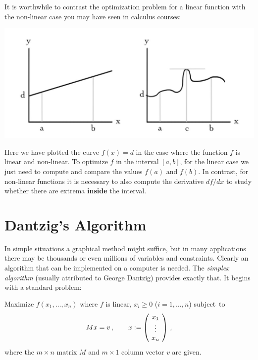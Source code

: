 It is worthwhile to contrast the optimization problem for a linear function with the non-linear case you may have seen in calculus courses:
\vspace{-1.5mm}
\begin{center}
\hspace{-1cm}\includegraphics[alt={Two graphs.  The first is a line for a≤x≤b and y=d.  The second is a wiggly curve with the same domain and range, but the maximum d occurs strictly between a and b.},scale=.33]{simplex/linvsnonlin.jpg}
\end{center}
Here we have plotted the curve $f(x)=d$ in the case where the function $f$ is linear and non-linear. 
To optimize $f$ in the interval $[a,b]$, for the linear case we just need to compute and compare the values $f(a)$ 
and $f(b)$. In contrast, for non-linear functions it is necessary to also compute the derivative $df/dx$ to study whether
there are extrema {\bfseries inside} the interval.

\section{Dantzig's Algorithm}\label{dantzig}

In simple situations a graphical method might suffice, but in many applications there may be thousands or even millions of variables 
and constraints. Clearly an algorithm that can be implemented on a computer is needed. The {\itshape simplex algorithm} (usually attributed to George Dantzig) provides exactly that. It begins with a standard problem:

\begin{problem}
Maximize $f(x_1,\ldots,x_n)$ where $f$ is linear, $x_i\geq 0$ ($i=1,\ldots, n$) subject~to  
\[
Mx = v\, ,\qquad x:=\left(\!\begin{array}{c} x_1\\\vdots \\ x_n \end{array}\!\right)\, ,
\]
where the $m\times n$ matrix $M$ and $m\times 1$ column vector $v$ are given.
\end{problem}
 
